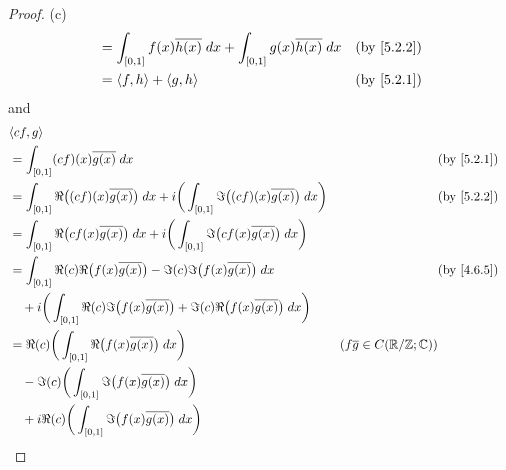 \begin{proof}{(c)}
\begin{align*}
     & = \int_{[0, 1]} f(x) \overline{h(x)} \; dx + \int_{[0, 1]} g(x) \overline{h(x)} \; dx                                               &                                                      & \by{5.2.2} \\
     & = \inner*{f, h} + \inner*{g, h}                                                                                                     &                                                      & \by{5.2.1}
  \end{align*}
  and
  \begin{align*}
     & \inner*{cf, g}                                                                                                                                                                                   \\
     & = \int_{[0, 1]} (cf)(x) \overline{g(x)} \; dx                                                                                                &                                      & \by{5.2.1} \\
     & = \int_{[0, 1]} \Re\big((cf)(x) \overline{g(x)}\big) \; dx + i \bigg(\int_{[0, 1]} \Im\big((cf)(x) \overline{g(x)}\big) \; dx\bigg)          &                                      & \by{5.2.2} \\
     & = \int_{[0, 1]} \Re\big(cf(x) \overline{g(x)}\big) \; dx + i \bigg(\int_{[0, 1]} \Im\big(cf(x) \overline{g(x)}\big) \; dx\bigg)                                                                  \\
     & = \int_{[0, 1]} \Re(c) \Re\big(f(x) \overline{g(x)}\big) - \Im(c) \Im\big(f(x) \overline{g(x)}\big) \; dx                                    &                                      & \by{4.6.5} \\
     & \quad + i \bigg(\int_{[0, 1]} \Re(c) \Im\big(f(x) \overline{g(x)}\big) + \Im(c) \Re\big(f(x) \overline{g(x)}\big) \; dx\bigg)                                                                    \\
     & = \Re(c) \bigg(\int_{[0, 1]} \Re\big(f(x) \overline{g(x)}\big) \; dx\bigg)                                                                   & (f \overline{g} \in C(\R / \Z ; \C))              \\
     & \quad - \Im(c) \bigg(\int_{[0, 1]} \Im\big(f(x) \overline{g(x)}\big) \; dx\bigg)                                                                                                                 \\
     & \quad + i \Re(c) \bigg(\int_{[0, 1]} \Im\big(f(x) \overline{g(x)}\big) \; dx\bigg)                                                                                                               \\

\end{align*}
\end{proof}
